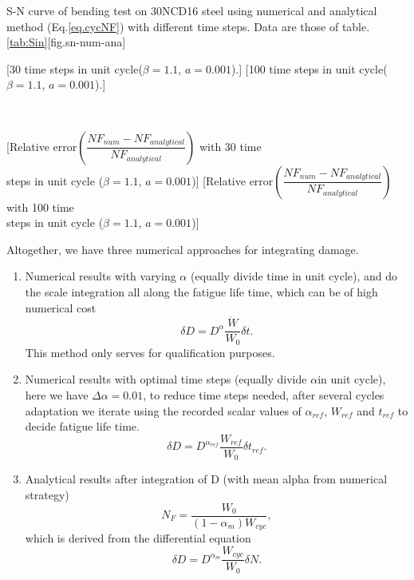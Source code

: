 \begin{Figure}[]{S-N curve of bending test on 30NCD16 steel using numerical and analytical method (Eq.\eqref{eq.cycNF}) with different time steps. Data are those of table.\ref{tab:Sin}}[fig.sn-num-ana]
	\centerline{
		[30 time steps in unit cycle($\beta=1.1$, $a=0.001$).]
		[100 time steps in unit cycle($\beta=1.1$, $a=0.001$).]}
	\\
	\centerline{
		[Relative error$\left( \dfrac{NF_{num}-NF_{analytical}}{NF_{analytical}}\right)$  with 30 time \protect \\ steps in unit cycle  ($\beta=1.1$, $a=0.001$)]
		[Relative error$\left( \dfrac{NF_{num}-NF_{analytical}}{NF_{analytical}}\right)$   with 100 time \protect \\ steps in unit cycle  ($\beta=1.1$, $a=0.001$)]}
	\label{fig.sn-num-ana}
\end{Figure}

\newpage

Altogether, we have three numerical approaches for integrating damage.

\begin{enumerate}
	\item  Numerical results with varying $\alpha$ (equally divide time in unit cycle), and do the scale integration all along the fatigue life time, which can be of high numerical cost$$\delta D=D^\alpha\frac{\dot{W}}{W_0}\delta t.$$
	This method only serves for qualification purposes.
	\vspace{6pt}
	
	\item  Numerical results with optimal time steps (equally divide $\alpha$in unit cycle), here we have $\Delta\alpha=0.01$, to reduce time steps needed, after several cycles adaptation we iterate using the recorded scalar values of $\alpha_{ref}$, $W_{ref}$ and $t_{ref}$ to decide fatigue life time.
	$$\delta D=D^{\alpha_{ref}}\frac{W_{ref}}{W_0}\delta t_{ref}.$$
	\vspace{6pt}
	
	\item  Analytical results after integration of D (with mean alpha from numerical strategy)$$N_F=\frac{W_0}{( 1-\alpha_m)W_{cyc}},$$ 
	which is derived from the differential equation
	$$\delta D=D^{\alpha_m}\frac{W_{cyc}}{W_0}\delta N.$$
\end{enumerate}	


